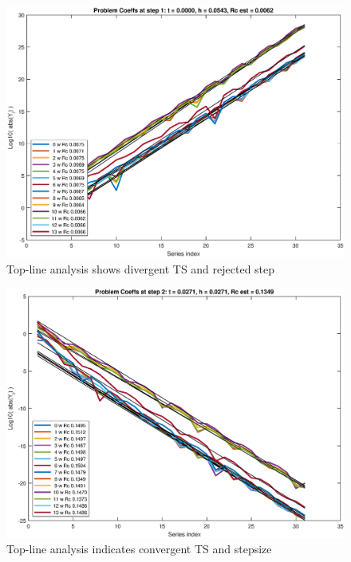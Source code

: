 \documentclass[11pt,svgnames,fleqn]{beamer}
\begin{document}
\begin{frame}

\begin{figure}
  \centering
  \vspace{-0.4cm}
  \includegraphics[width=.9\linewidth]{divergent.eps} %
  \caption{Top-line analysis shows divergent TS and rejected step}
\end{figure}

\end{frame}

\begin{frame}

\begin{figure}
  \centering
  \vspace{-0.4cm}
  \includegraphics[width=.9\linewidth]{convergent.eps} %
  \caption{Top-line analysis indicates convergent TS and stepsize}
\end{figure}

\end{frame}
\end{document}
